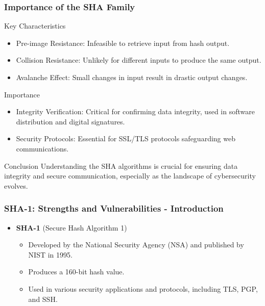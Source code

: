 \documentclass{beamer}
\begin{document}
\begin{frame}[fragile]
    \frametitle{Importance of the SHA Family}
    \begin{block}{Key Characteristics}
        \begin{itemize}
            \item Pre-image Resistance: Infeasible to retrieve input from hash output.
            \item Collision Resistance: Unlikely for different inputs to produce the same output.
            \item Avalanche Effect: Small changes in input result in drastic output changes.
        \end{itemize}
    \end{block}

    \begin{block}{Importance}
        \begin{itemize}
            \item Integrity Verification: Critical for confirming data integrity, used in software distribution and digital signatures.
            \item Security Protocols: Essential for SSL/TLS protocols safeguarding web communications.
        \end{itemize}
    \end{block}

    \begin{block}{Conclusion}
        Understanding the SHA algorithms is crucial for ensuring data integrity and secure communication, especially as the landscape of cybersecurity evolves.
    \end{block}
\end{frame}

\begin{frame}[fragile]
    \frametitle{SHA-1: Strengths and Vulnerabilities - Introduction}
    \begin{itemize}
        \item \textbf{SHA-1} (Secure Hash Algorithm 1)
        \begin{itemize}
            \item Developed by the National Security Agency (NSA) and published by NIST in 1995.
            \item Produces a 160-bit hash value.
            \item Used in various security applications and protocols, including TLS, PGP, and SSH.
        \end{itemize}
    \end{itemize}
\end{frame}
\end{document}
